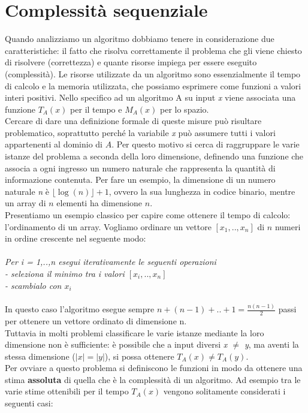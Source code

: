 \section{Complessità sequenziale}
Quando analizziamo un algoritmo dobbiamo tenere in considerazione due caratteristiche: il fatto che risolva correttamente il problema che gli viene chiesto di risolvere (correttezza) e quante risorse impiega per essere eseguito (complessità). Le risorse utilizzate da un algoritmo sono essenzialmente il tempo di calcolo e la memoria utilizzata, che possiamo esprimere come funzioni a valori interi positivi. Nello specifico ad un algoritmo A su input \textit{x} viene associata una funzione ${T}_{A}(x)$ per il tempo e ${M}_{A}(x)$ per lo spazio.\\
Cercare di dare una definizione formale di queste misure può risultare problematico, soprattutto perché la variabile \textit{x} può assumere tutti i valori appartenenti al dominio di $A$. Per questo motivo si cerca di raggruppare le varie istanze del problema a seconda della loro dimensione, definendo una funzione che associa a ogni ingresso un numero naturale che rappresenta la quantità di informazione contenuta. Per fare un esempio, la dimensione di un numero naturale \textit{n} è $\lfloor \log(n) \rfloor +1$, ovvero la sua lunghezza in codice binario, mentre un array di $n$ elementi ha dimensione $n$.\\
Presentiamo un esempio classico per capire come ottenere il tempo di calcolo: l'ordinamento di un array. Vogliamo ordinare un vettore $[x_1,..,x_n]$ di $n$ numeri in ordine crescente nel seguente modo:\\
\\
\textit{Per i = 1,..,n esegui iterativamente le seguenti operazioni\\
    - seleziona il minimo tra i valori $[x_i,..,x_n]$\\
    - scambialo con $x_i$}\\
\\
In questo caso l'algoritmo esegue sempre $n + (n-1) + .. + 1 = \frac{n(n-1)}{2} $ passi per ottenere un vettore ordinato di dimensione n.\\
Tuttavia in molti problemi classificare le varie istanze mediante la loro dimensione non è sufficiente: è possibile che a input diversi \textit{x $\neq$ y}, ma aventi la stessa dimensione ($|x| = |y|$), si possa ottenere ${T}_{A}(x) \neq {T}_{A}(y)$.\\
Per ovviare a questo problema si definiscono le funzioni in modo da ottenere una stima \textbf{assoluta} di quella che è la complessità di un algoritmo. Ad esempio tra le varie stime ottenibili per il tempo ${T}_{A}(x)$ vengono solitamente considerati i seguenti casi:
